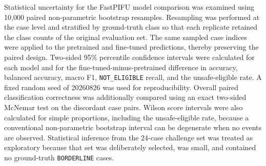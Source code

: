 Statistical uncertainty for the FastPIFU model comparison was examined using
10,000 paired non-parametric bootstrap resamples. Resampling was
performed at the case level and stratified by ground-truth class so that each
replicate retained the class counts of the original evaluation set. The same
sampled case indices were applied to the pretrained and fine-tuned predictions,
thereby preserving the paired design. Two-sided 95\% percentile confidence
intervals were calculated for each model and for the fine-tuned-minus-pretrained
difference in accuracy, balanced accuracy, macro F1,
\texttt{NOT\_ELIGIBLE} recall, and the unsafe-eligible rate. A fixed random
seed of 20260826 was used for reproducibility. Overall paired classification
correctness was additionally compared using an exact two-sided McNemar test on
the discordant case pairs. Wilson score intervals were also calculated for
simple proportions, including the unsafe-eligible rate, because a conventional
non-parametric bootstrap interval can be degenerate when no events are
observed. Statistical inference from the 24-case challenge set was treated as
exploratory because that set was deliberately selected, was small, and
contained no ground-truth \texttt{BORDERLINE} cases.
